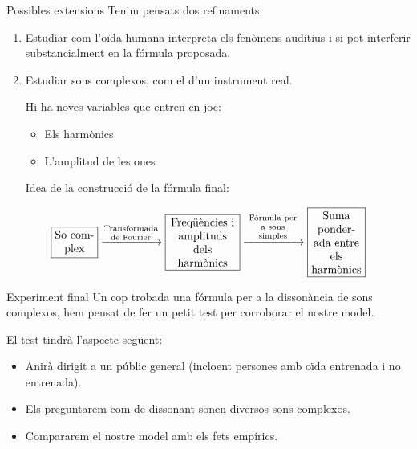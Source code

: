 \documentclass[10pt,hyperref={colorlinks,linkcolor=black,citecolor=blue,urlcolor=blue!70},handout]{beamer}
\begin{document}
\begin{frame}{Possibles extensions}
    Tenim pensats dos refinaments:
    \begin{enumerate}
        \item Estudiar com l'oïda humana interpreta els fenòmens auditius i si pot interferir substancialment en la fórmula proposada.\pause
        \item Estudiar sons complexos, com el d'un instrument real.\par\pause
        Hi ha noves variables que entren en joc:
        \begin{itemize}
            \item Els harmònics\pause
            \item L'amplitud de les ones\pause
        \end{itemize}
        \vspace{0.5cm}
        Idea de la construcció de la fórmula final:
    \end{enumerate}
        $$\boxed{\parbox{3.5em}{\centering So complex}}\xrightarrow{\parbox{4.8em}{\centering\scriptsize Transformada de Fourier}}\boxed{\parbox{6em}{\centering Freqüències i amplituds dels harmònics}}\xrightarrow{\parbox{4.8em}{\centering\scriptsize Fórmula per a sons simples}}\boxed{\parbox{4.5em}{\centering Suma ponderada entre els harmònics}}$$
    \end{frame}
\begin{frame}{Experiment final}
    Un cop trobada una fórmula per a la dissonància de sons complexos, hem pensat de fer un petit test per corroborar el nostre model.\par\pause El test tindrà l'aspecte següent:
    \begin{itemize}
        \item Anirà dirigit a un públic general (incloent persones amb oïda entrenada i no entrenada).\pause
        \item Els preguntarem com de dissonant sonen diversos sons complexos.\pause
        \item Compararem el nostre model amb els fets empírics.
    \end{itemize}
\end{frame}
\end{document}
